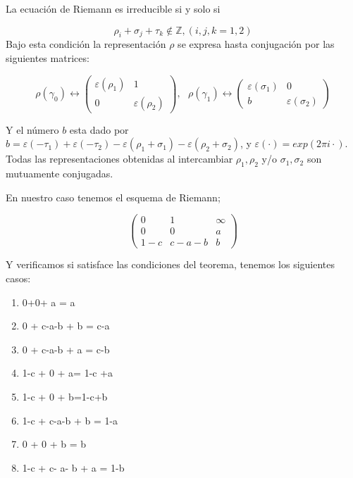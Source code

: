 \begin{thm} \label{riemann-irreducible}

La ecuaci\'on de Riemann es irreducible si y solo si

$$\rho_{i} + \sigma_{j} + \tau_{k} \notin \mathbb{Z}, (i,j,k=1,2)  $$
Bajo esta condici\'on la representaci\'on $\rho $ se expresa hasta conjugaci\'on por las siguientes matrices:

$$ \rho (\gamma_{0}) \leftrightarrow  \begin{pmatrix}
 \varepsilon(\rho_{1})& 1\\
 0& \varepsilon(\rho_{2})
 \end{pmatrix}  ,\ \ \
\rho (\gamma_{1}) \leftrightarrow \begin{pmatrix}
 \varepsilon(\sigma_{1})& 0\\
 b& \varepsilon(\sigma_{2})
 \end{pmatrix}
$$

 Y el n\'umero $b$ esta dado por $b= \varepsilon(-\tau_{1}) + \varepsilon(-\tau_{2}) - \varepsilon(\rho_{1} + \sigma_{1}) - \varepsilon(\rho_{2} + \sigma_{2})$, y $\varepsilon(\cdot) =exp(2 \pi i \cdot)$. Todas las representaciones  obtenidas al intercambiar $\rho_{1},\rho_{2}$ y/o $\sigma_{1},\sigma_{2}$ son mutuamente conjugadas.

\end{thm}

En nuestro caso tenemos el esquema de Riemann;

\[ \left( \begin{array}{ccc}
0 & 1 & \infty \\
0 & 0 & a \\
1-c &c-a-b & b  \end{array} \right)\]

Y verificamos si satisface las condiciones del teorema, tenemos los siguientes casos:


\begin{enumerate}
\item 0+0+ a = a
\item 0 + c-a-b + b = c-a
\item 0 + c-a-b + a = c-b
\item 1-c + 0 + a= 1-c +a
\item 1-c + 0 + b=1-c+b
\item 1-c + c-a-b + b = 1-a
\item 0 + 0 + b = b
\item 1-c + c- a- b + a = 1-b
\end{enumerate}


